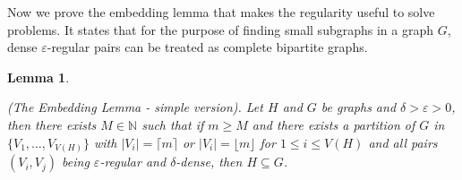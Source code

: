 \documentclass[12pt,twoside,a4paper,bibliography=totocnumbered]{book}
\numberwithin{equation}{section}
\newtheorem{lemma}     	[theorem] {Lemma}
\newtheorem{definition}	[theorem] {Definition}
\theoremstyle{remark}
\begin{document}
Now we prove the embedding lemma that makes the regularity useful to solve problems. It states that for the purpose of finding small subgraphs in a graph $G$, dense $\varepsilon$-regular pairs can be treated as complete bipartite graphs.


\begin{lemma}\label{lemma:embeddinglemma}


(The Embedding Lemma - simple version). Let $H$ and $G$ be graphs and $\delta > \varepsilon > 0$, then there exists $M \in \mathbb{N}$ such that if $m \geq M$ and there exists a partition of $G$ in $\{V_1, \ldots, V_{V(H)}\}$ with $|V_i| = \lceil m \rceil$ or $|V_i| = \lfloor m \rfloor$ for $1 \leq i \leq V(H)$ and all pairs $(V_i,V_j)$ being $\varepsilon$-regular and $\delta$-dense, then $H \subseteq G$. 
\end{lemma} 
\end{document}
